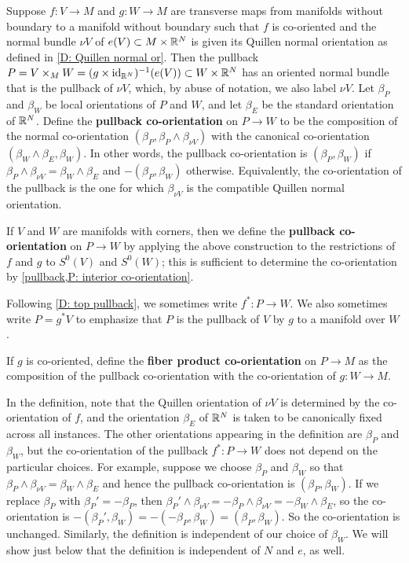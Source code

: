 \begin{definition}\label{D: pullback coorient}
	Suppose $f \colon V \to M$ and $g \colon W \to M$ are transverse maps from manifolds without boundary to a manifold without boundary such that $f$ is co-oriented and the normal bundle $\nu V$ of $e(V) \subset M \times \mathbb{R}^N$ is given its Quillen normal orientation as defined in \cref{D: Quillen normal or}.
	Then the pullback $P = V \times_M W = (g \times \mathrm{id}_{\mathbb{R}^N})^{-1}(e(V)) \subset W \times \mathbb{R}^N$ has an oriented normal bundle that is the pullback of $\nu V$, which, by abuse of notation, we also label $\nu V$.
	Let $\beta_P$ and $\beta_W$ be local orientations of $P$ and $W$, and let $\beta_E$ be the standard orientation of $\mathbb{R}^N$.
	Define the \textbf{pullback co-orientation} on $P \to W$ to be the composition of the normal co-orientation $(\beta_P,\beta_P \wedge \beta_{\nu V})$ with the canonical co-orientation $(\beta_W \wedge \beta_E,\beta_W)$.
	In other words, the pullback co-orientation is $(\beta_P,\beta_W)$ if $\beta_P \wedge \beta_{\nu V} = \beta_W \wedge \beta_E$ and $-(\beta_P,\beta_W)$ otherwise.
	Equivalently, the co-orientation of the pullback is the one for which $\beta_{\nu V}$ is the compatible Quillen normal orientation.

	If $V$ and $W$ are manifolds with corners, then we define the \textbf{pullback co-orientation} on $P \to W$ by applying the above construction to the restrictions of $f$ and $g$ to $S^0(V)$ and $S^0(W)$; this is sufficient to determine the co-orientation by \cref{pullback,P: interior co-orientation}.

	Following \cref{D: top pullback}, we sometimes write $f^* \colon P \to W$.
	We also sometimes write $P = g^*V$ to emphasize that $P$ is the pullback of $V$ by $g$ to a manifold over $W$.

	If $g$ is co-oriented, define the \textbf{fiber product co-orientation} on $P \to M$ as the composition of the pullback co-orientation with the co-orientation of $g \colon W \to M$.
\end{definition}

In the definition, note that the Quillen orientation of $\nu V$ is determined by the co-orientation of $f$, and the orientation $\beta_E$ of $\mathbb{R}^N$ is taken to be canonically fixed across all instances.
The other orientations appearing in the definition are $\beta_P$ and $\beta_W$, but the co-orientation of the pullback $f^* \colon P \to W$ does not depend on the particular choices.
For example, suppose we choose $\beta_P$ and $\beta_W$ so that $\beta_P \wedge \beta_{\nu V} = \beta_W \wedge \beta_E$ and hence the pullback co-orientation is $(\beta_P,\beta_W)$.
If we replace $\beta_P$ with $\beta_P' = -\beta_P$, then
$\beta_P' \wedge \beta_{\nu V} = -\beta_P \wedge \beta_{\nu V} = -\beta_W \wedge \beta_E$, so the co-orientation is $-(\beta_P',\beta_W) = -(-\beta_P,\beta_W) = (\beta_P,\beta_W)$.
So the co-orientation is unchanged.
Similarly, the definition is independent of our choice of $\beta_W$.
We will show just below that the definition is independent of $N$ and $e$, as well.

